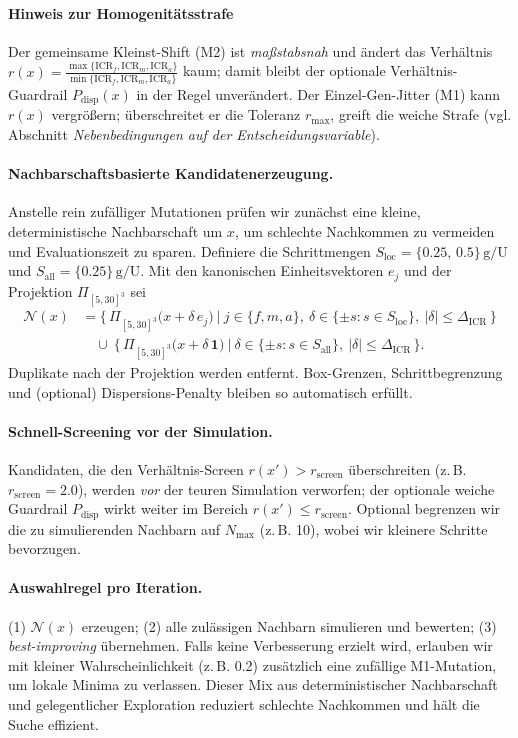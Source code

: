 \documentclass[ngerman,a4paper,12pt,pdftex]{article}
\newcommand{\ICRf}{\mathrm{ICR}_f}
\newcommand{\ICRm}{\mathrm{ICR}_m}
\newcommand{\ICRa}{\mathrm{ICR}_a}
\newcommand{\DICR}{\Delta_{\mathrm{ICR}}}
\newcommand{\rmax}{r_{\max}}
\begin{document}
\paragraph{Hinweis zur Homogenitätsstrafe}
Der gemeinsame Kleinst-Shift (M2) ist \emph{maßstabsnah} und ändert das Verhältnis \(r(x)=\tfrac{\max\{\ICRf,\ICRm,\ICRa\}}{\min\{\ICRf,\ICRm,\ICRa\}}\) kaum; damit bleibt der optionale Verhältnis-Guardrail \(P_{\mathrm{disp}}(x)\) in der Regel unverändert. Der Einzel-Gen-Jitter (M1) kann \(r(x)\) vergrößern; überschreitet er die Toleranz \(\rmax\), greift die weiche Strafe (vgl. Abschnitt \emph{Nebenbedingungen auf der Entscheidungsvariable}).

\paragraph{Nachbarschaftsbasierte Kandidatenerzeugung.}
Anstelle rein zufälliger Mutationen prüfen wir zunächst eine kleine, deterministische Nachbarschaft um \(x\), um schlechte Nachkommen zu vermeiden und Evaluationszeit zu sparen. Definiere die Schrittmengen \(S_{\text{loc}}=\{0.25,\,0.5\}\,\mathrm{g/U}\) und \(S_{\text{all}}=\{0.25\}\,\mathrm{g/U}\).
Mit den kanonischen Einheitsvektoren \(e_j\) und der Projektion \(\Pi_{[5,30]^3}\) sei
\[
\begin{aligned}
\mathcal{N}(x)
&= \Big\{\, \Pi_{[5,30]^3}\!\big(x+\delta\,e_j\big)\ \big|\ j\in\{f,m,a\},\ \delta\in\{\pm s : s\in S_{\text{loc}}\},\ |\delta|\le \DICR \,\Big\}\\
&\quad\cup\ \Big\{\, \Pi_{[5,30]^3}\!\big(x+\delta\,\mathbf{1}\big)\ \big|\ \delta\in\{\pm s : s\in S_{\text{all}}\},\ |\delta|\le \DICR \,\Big\}.
\end{aligned}
\]
Duplikate nach der Projektion werden entfernt. Box-Grenzen, Schrittbegrenzung und (optional) Dispersions-Penalty bleiben so automatisch erfüllt.

\paragraph{Schnell-Screening vor der Simulation.}
Kandidaten, die den Verhältnis-Screen \(r(x')>r_{\text{screen}}\) überschreiten (z.\,B. \(r_{\text{screen}}=2.0\)), werden \emph{vor} der teuren Simulation verworfen; der optionale weiche Guardrail \(P_{\mathrm{disp}}\) wirkt weiter im Bereich \(r(x')\le r_{\text{screen}}\).
Optional begrenzen wir die zu simulierenden Nachbarn auf \(N_{\max}\) (z.\,B. 10), wobei wir kleinere Schritte bevorzugen.

\paragraph{Auswahlregel pro Iteration.}
(1) \(\mathcal{N}(x)\) erzeugen; (2) alle zulässigen Nachbarn simulieren und bewerten; (3) \emph{best-improving} übernehmen.
Falls keine Verbesserung erzielt wird, erlauben wir mit kleiner Wahrscheinlichkeit (z.\,B. 0.2) zusätzlich eine zufällige M1-Mutation, um lokale Minima zu verlassen.
Dieser Mix aus deterministischer Nachbarschaft und gelegentlicher Exploration reduziert schlechte Nachkommen und hält die Suche effizient.
\end{document}
